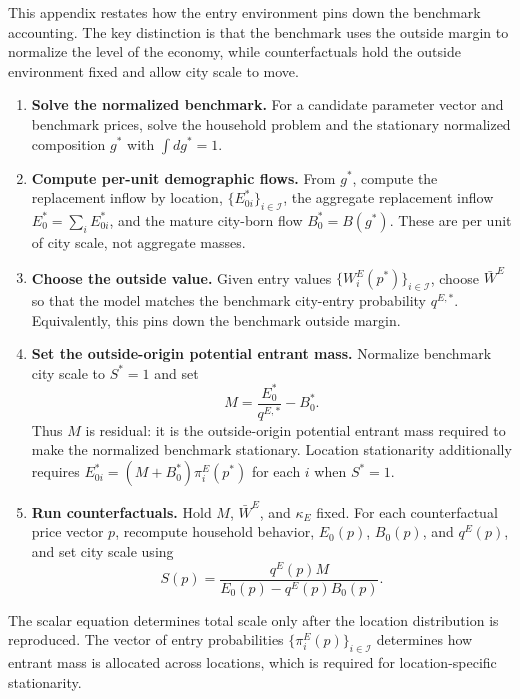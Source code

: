 \documentclass[11pt]{article}
\newcommand{\Iset}{\mathcal I}
\begin{document}
This appendix restates how the entry environment pins down the benchmark accounting. The key distinction is that the benchmark uses the outside margin to normalize the level of the economy, while counterfactuals hold the outside environment fixed and allow city scale to move.

\begin{enumerate}[leftmargin=*]
    \item \textbf{Solve the normalized benchmark.} For a candidate parameter vector and benchmark prices, solve the household problem and the stationary normalized composition $g^\ast$ with $\int dg^\ast=1$.

    \item \textbf{Compute per-unit demographic flows.} From $g^\ast$, compute the replacement inflow by location, $\{E_{0i}^\ast\}_{i\in\Iset}$, the aggregate replacement inflow $E_0^\ast=\sum_iE_{0i}^\ast$, and the mature city-born flow $B_0^\ast=B(g^\ast)$. These are per unit of city scale, not aggregate masses.

    \item \textbf{Choose the outside value.} Given entry values $\{W_i^E(p^\ast)\}_{i\in\Iset}$, choose $\bar W^E$ so that the model matches the benchmark city-entry probability $q^{E,\ast}$. Equivalently, this pins down the benchmark outside margin.

    \item \textbf{Set the outside-origin potential entrant mass.} Normalize benchmark city scale to $S^\ast=1$ and set
    \begin{equation*}
        M=\frac{E_0^\ast}{q^{E,\ast}}-B_0^\ast.
    \end{equation*}
    Thus $M$ is residual: it is the outside-origin potential entrant mass required to make the normalized benchmark stationary. Location stationarity additionally requires $E_{0i}^\ast=(M+B_0^\ast)\pi_i^E(p^\ast)$ for each $i$ when $S^\ast=1$.

    \item \textbf{Run counterfactuals.} Hold $M$, $\bar W^E$, and $\kappa_E$ fixed. For each counterfactual price vector $p$, recompute household behavior, $E_0(p)$, $B_0(p)$, and $q^E(p)$, and set city scale using
    \begin{equation*}
        S(p)=\frac{q^E(p)M}{E_0(p)-q^E(p)B_0(p)}.
    \end{equation*}
\end{enumerate}

The scalar equation determines total scale only after the location distribution is reproduced. The vector of entry probabilities $\{\pi_i^E(p)\}_{i\in\Iset}$ determines how entrant mass is allocated across locations, which is required for location-specific stationarity.


\end{document}
